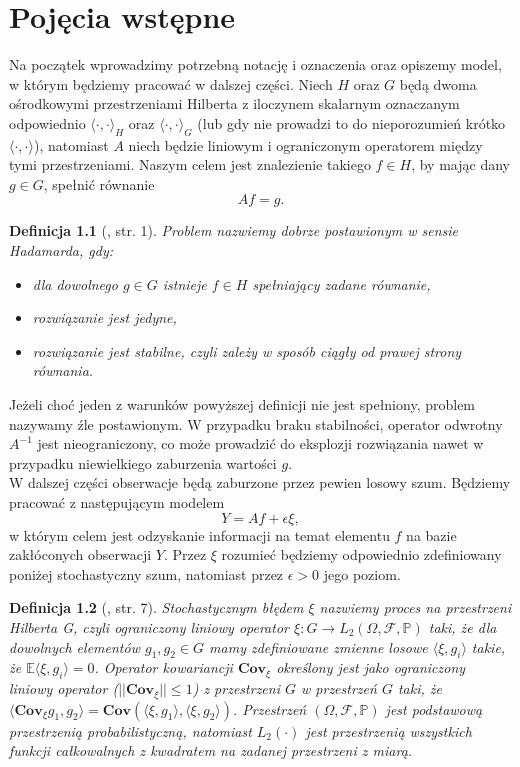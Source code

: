 \documentclass[man,mfiu]{mgrwms}
\newtheorem{df}{Definicja}[chapter]
\begin{document}
\chapter{Pojęcia wstępne}\label{PW}
Na początek wprowadzimy potrzebną notację i oznaczenia oraz opiszemy model, w którym będziemy pracować w dalszej części. 
Niech $H$ oraz $G$ będą dwoma ośrodkowymi przestrzeniami Hilberta z iloczynem skalarnym oznaczanym odpowiednio $\langle \cdot,\cdot \rangle_H$ oraz $\langle \cdot,\cdot \rangle_G$ (lub gdy nie prowadzi to do nieporozumień krótko $\langle \cdot,\cdot \rangle$), natomiast $A$ niech będzie liniowym i ograniczonym operatorem między tymi przestrzeniami. Naszym celem jest znalezienie takiego $f\in H$, by mając dany $g\in G$, spełnić równanie
\begin{displaymath}
Af=g.
\end{displaymath}
\begin{df}[\cite{szkutnik}, str. 1] Problem nazwiemy dobrze postawionym w sensie Hadamarda, gdy:
\begin{itemize}
\item dla dowolnego $g\in G$ istnieje $f\in H$ spełniający zadane równanie,
\item rozwiązanie jest jedyne,
\item rozwiązanie jest stabilne, czyli zależy w sposób ciągły od prawej strony równania.
\end{itemize}
\end{df}
Jeżeli choć jeden z warunków powyższej definicji nie jest spełniony, problem nazywamy źle postawionym. W przypadku braku stabilności, operator odwrotny $A^{-1}$ jest nieograniczony, co może prowadzić do eksplozji rozwiązania nawet w przypadku niewielkiego zaburzenia wartości $g$.\\
\indent W dalszej części obserwacje będą zaburzone przez pewien losowy szum. Będziemy pracować z następującym modelem 
\begin{equation}\label{Af}
Y=Af+\epsilon\xi,
\end{equation}
w którym celem jest odzyskanie informacji na temat elementu $f$ na bazie zakłóconych obserwacji $Y$. Przez $\xi$ rozumieć będziemy odpowiednio zdefiniowany poniżej stochastyczny szum, natomiast przez $\epsilon>0$ jego poziom.
\begin{df}[\cite{iphde}, str. 7]\label{szum} Stochastycznym błędem $\xi$ nazwiemy proces na przestrzeni Hilberta G, czyli ograniczony liniowy operator $\xi\colon G\to L_2(\Omega, \mathcal{F},\mathbb{P})$ taki, że dla dowolnych elementów $g_1,g_2\in G$ mamy zdefiniowane zmienne losowe $\langle \xi, g_i\rangle$ takie, że $\mathbb{E}\langle \xi, g_i\rangle =0$. Operator kowariancji $\textbf{Cov}_{\xi}$ określony jest jako ograniczony liniowy operator ($||\textbf{Cov}_{\xi}||\leq 1$) z przestrzeni $G$ w przestrzeń $G$ taki, że $ \langle \textbf{Cov}_{\xi}g_1,g_2\rangle=\textbf{Cov}(\langle \xi,g_1\rangle,\langle \xi,g_2\rangle)$. Przestrzeń $(\Omega, \mathcal{F},\mathbb{P})$ jest podstawową przestrzenią probabilistyczną, natomiast  $L_2(\cdot)$ jest przestrzenią wszystkich funkcji całkowalnych z kwadratem na zadanej przestrzeni z miarą.
\end{df}
\end{document}

